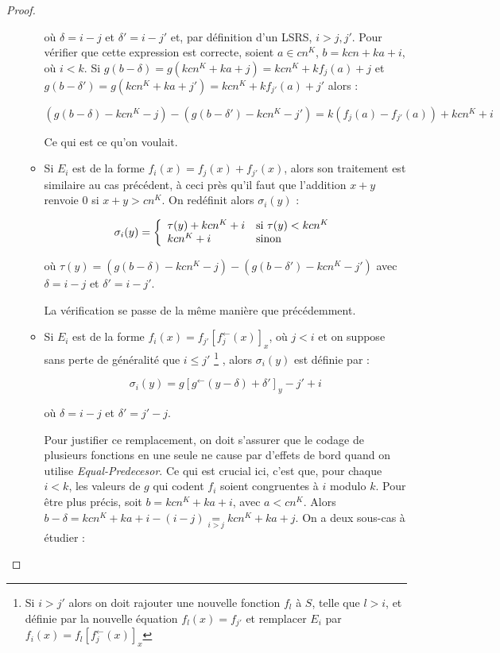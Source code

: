 \documentclass{report}
\newcommand{\eqpred}[3]{#1\left[ #2^{\leftarrow}(#3) \right]_{#3}}
\newcommand{\eqpredfi}[5]{#1\left[ #2^{\leftarrow}(#3) #4 \right]_{#5}} %
\begin{document}
\begin{proof}
\begin{enumerate}[itemsep=-1mm,leftmargin=2cm]
\begin{itemize}[itemsep=-1mm, leftmargin=1cm]
							où $\delta = i -j$ et $\delta' = i - j'$ et, par définition d'un LSRS, $i > j, j'$. Pour vérifier que cette expression est correcte, soient $a \in cn^K$, $b = kcn + ka + i$, où $i<k$. Si $g(b - \delta) = g(kcn^K + ka + j) = kcn^K + kf_j(a) + j$ et $g(b - \delta') = g(kcn^K + ka + j') = kcn^K + kf_{j'}(a) + j'$ alors :
							
							\[
								\left( g\left( b - \delta \right) - kcn^K - j \right) - \left( g\left( b - \delta' \right) - kcn^K - j' \right)
								=  k \left( f_{j}(a) - f_{j'}(a) \right) + kcn^K + i
							\]

							
							Ce qui est ce qu'on voulait.
							
						\item
							Si $E_i$ est de la forme $f_i(x) = f_j(x) + f_{j'}(x)$, alors son traitement est similaire au cas précédent, à ceci près qu'il faut que l'addition $x + y$ renvoie $0$ si $x + y > cn^K$. On redéfinit alors $\sigma_i(y)$ : 
							
							\[
								\sigma_i(y) = \left\lbrace \begin{array}{ll} 
									\tau(y) + kcn^K + i & \text{si $\tau(y) < kcn^K$} \\
									kcn^K + i & \text{sinon}
									 \end{array} \right.
							\]
							
							où $\tau(y) = \left( g\left( b - \delta \right) - kcn^K - j \right) - \left( g\left( b - \delta' \right) - kcn^K - j' \right)$ avec $\delta = i - j$ et $\delta' = i - j'$. 
							
							La vérification se passe de la même manière que précédemment.
							
						\item
							Si $E_i$ est de la forme $f_i(x) = \eqpred{f_{j'}}{f_j}{x}$, où $j < i$ et on suppose sans perte de généralité que $i \leqslant j'$ 
								\footnote{Si $i > j'$ alors on doit rajouter une nouvelle fonction $f_l$ à $S$, telle que $l > i$, et définie par la nouvelle équation $f_l(x) = f_{j'}$ et remplacer $E_i$ par $f_i(x) = \eqpred{f_{l}}{f_j}{x}$}
							, alors $\sigma_i(y)$ est définie par :
							
							\[
								\sigma_i(y) = \eqpredfi{g}{g}{y-\delta}{ + \delta'}{y} - j' + i
							\]
							
							où $\delta = i - j$ et $\delta' = j' - j$.
							
							Pour justifier ce remplacement, on doit s'assurer que le codage de plusieurs fonctions en une seule ne cause par d'effets de bord quand on utilise \emph{Equal-Predecesor}. Ce qui est crucial ici, c'est que, pour chaque $i<k$, les valeurs de $g$ qui codent $f_i$ soient congruentes à $i$ modulo $k$. Pour être plus précis, soit $b = kcn^K + ka + i$, avec $a< cn^K$. Alors $b-\delta = kcn^K + ka + i - (i - j) \underset{i>j}{=} kcn^K + ka + j$. On a deux sous-cas à étudier :
							

\end{itemize}
\end{enumerate}
\end{proof}
\end{document}
